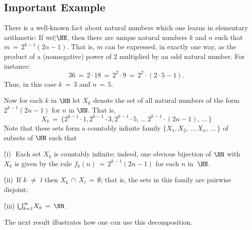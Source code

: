\VV

            \subsection{\small{\bf Important Example}}
            \label{ExampA20.60}

        There is a well-known fact about natural numbers which one learns in elementary arithmetic:
    If $m{\in}{\NN}$, then there are unique natural numbers $k$ and $n$ such that $m \,=\, 2^{k-1}(2n-1)$.
    That is, $m$ can be expressed, in exactly one way, as the product of a (nonnegative) power of $2$ multiplied by an odd natural number.
    For instance:
        \begin{displaymath}
        36 \,=\, 2{\cdot}18 \,=\, 2^{2}{\cdot}9 \,=\, 2^{2}{\cdot}(2{\cdot}5-1).
        \end{displaymath}
    Thus, in this case $k \,=\, 3$ and $n \,=\, 5$.

        Now for each $k$ in ${\NN}$ let $X_{k}$ denote the set of  all natural numbers of the form $2^{k-1}(2n-1)$ for $n$ in ${\NN}$.
    That is,
        \begin{displaymath}
        X_{k} \,=\, \{2^{k-1}{\cdot}1, 2^{k-1}{\cdot}3, 2^{k-1}{\cdot}5,\,{\ldots}\,2^{k-1}{\cdot}(2n-1),\,{\ldots}\,\}
        \end{displaymath}
    Note that these sets form a countably infinite family $\{X_{1},X_{2},\,{\ldots}\,X_{n},\,{\ldots}\,\}$ of subsets of ${\NN}$ such that

       \h (i)\,\, Each set $X_{k}$ is countably infinite; indeed, one obvious bijection of ${\NN}$ with $X_{k}$ is given by the rule $f_{k}(n) \,=\, 2^{k-1}(2n-1)$ for each $n$ in~${\NN}$.

       \h (ii)\, If $k \,\,{\neq}\,\, l$ then $X_{k}\,{\cap}\,X_{l} \,=\, {\emptyset}$;
    that is, the sets in this family are pairwise disjoint;

       \h (iii) ${\bigcup}_{k=1}^{{\infty}} X_{k} \,=\, {\NN}$.

\VA

    The next result illustrates how one can use this decomposition.

